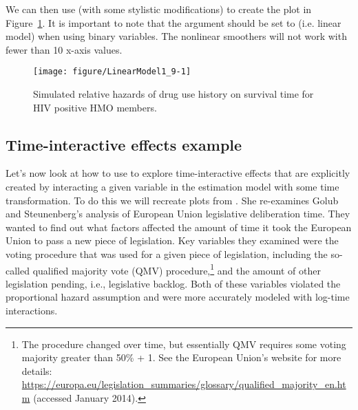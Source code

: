\documentclass[nojss]{jss}\usepackage[]{graphicx}\usepackage[]{color}
\newenvironment{knitrout}{}{} %
\begin{document}
We can then use  (with some stylistic modifications) to create the plot in Figure~\ref{LinearPlotDrug}. It is important to note that the  argument should be set to  (i.e. linear model) when using binary variables. The nonlinear smoothers will not work with fewer than 10 x-axis values.

\begin{figure}[t]

\begin{knitrout}
\color{fgcolor}

{\centering \texttt{[image: figure/LinearModel1\_9-1]} 

}



\end{knitrout}

    \caption{Simulated relative hazards of drug use history on survival time for HIV positive HMO members.}
    \label{LinearPlotDrug}
\end{figure}


\subsection{Time-interactive effects example}

Let's now look at how to use  to explore time-interactive effects that are explicitly created by interacting a given variable in the estimation model with some time transformation. To do this we will recreate plots from \cite{Licht2011}. She re-examines Golub and Steunenberg's \citeyearpar{Golub2007} analysis of European Union legislative deliberation time. They wanted to find out what factors affected the amount of time it took the European Union to pass a new piece of legislation. Key variables they examined were the voting procedure that was used for a given piece of legislation, including the so-called qualified majority vote (QMV) procedure,\footnote{The procedure changed over time, but essentially QMV requires some voting majority greater than 50\% + 1. See the European Union's website for more details: \url{https://europa.eu/legislation_summaries/glossary/qualified_majority_en.htm} (accessed January 2014).} and the amount of other legislation pending, i.e., legislative backlog. Both of these variables violated the proportional hazard assumption and were more accurately modeled with log-time interactions.
\end{document}
